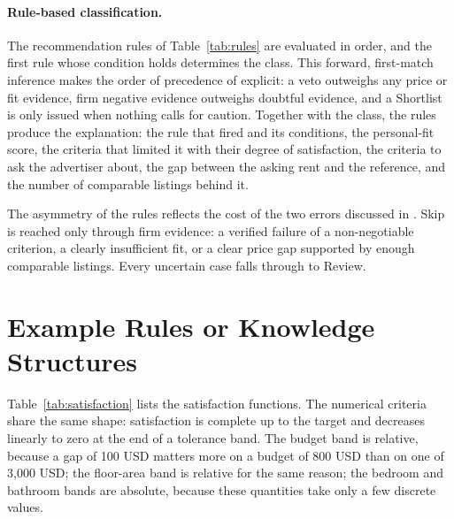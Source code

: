 \documentclass[12pt,a4paper]{report}
\begin{document}
\paragraph{Rule-based classification.} The recommendation rules of
Table~\ref{tab:rules} are evaluated in order, and the first rule whose
condition holds determines the class. This forward, first-match inference
makes the order of precedence of  explicit: a veto
outweighs any price or fit evidence, firm negative evidence outweighs
doubtful evidence, and a Shortlist is only issued when nothing calls for
caution. Together with the class, the rules produce the explanation: the
rule that fired and its conditions, the personal-fit score, the criteria
that limited it with their degree of satisfaction, the criteria to ask
the advertiser about, the gap between the asking rent and the reference,
and the number of comparable listings behind it.

The asymmetry of the rules reflects the cost of the two errors discussed
in . Skip is reached only through firm evidence: a
verified failure of a non-negotiable criterion, a clearly insufficient fit,
or a clear price gap supported by enough comparable listings. Every
uncertain case falls through to Review.

\section{Example Rules or Knowledge Structures}

Table~\ref{tab:satisfaction} lists the satisfaction functions. The
numerical criteria share the same shape: satisfaction is complete up to
the target and decreases linearly to zero at the end of a tolerance band.
The budget band is relative, because a gap of 100 USD matters more on a
budget of 800 USD than on one of 3{,}000 USD; the floor-area band is
relative for the same reason; the bedroom and bathroom bands are absolute,
because these quantities take only a few discrete values.
\end{document}
